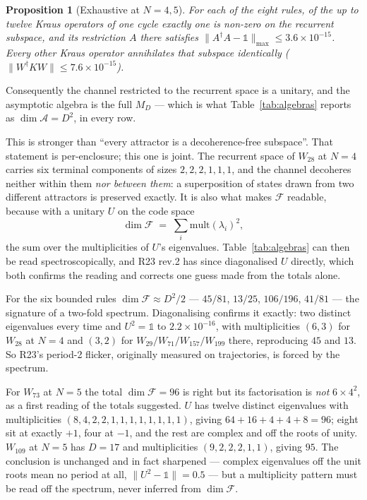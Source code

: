 \documentclass[11pt]{article}
\newcommand{\F}{\mathcal{F}}
\newcommand{\A}{\mathcal{A}}
\theoremstyle{plain}
\newtheorem{proposition}{Proposition}
\theoremstyle{remark}
\begin{document}
\begin{proposition}[Exhaustive at $N = 4, 5$]
\label{prop:unitary}
For each of the eight rules, of the up to twelve Kraus operators of one cycle
exactly \emph{one} is non-zero on the recurrent subspace, and its restriction
$A$ there satisfies $\lVert A^\dagger A - \mathbb{1}\rVert_{\max} \le
3.6\times10^{-15}$. Every other Kraus operator annihilates that subspace
identically ($\lVert W^\dagger K W\rVert \le 7.6\times10^{-15}$).
\end{proposition}

\noindent Consequently the channel restricted to the recurrent space is a
unitary, and the asymptotic algebra is the full $M_D$ --- which is what
Table~\ref{tab:algebras} reports as $\dim\A = D^2$, in every row.

This is stronger than ``every attractor is a decoherence-free subspace''. That
statement is per-enclosure; this one is joint. The recurrent space of $W_{28}$
at $N=4$ carries six terminal components of sizes $2,2,2,1,1,1$, and the
channel decoheres neither within them \emph{nor between them}: a superposition
of states drawn from two different attractors is preserved exactly. It is also
what makes $\F$ readable, because with a unitary $U$ on the code space
\[
  \dim\F \;=\; \sum_i \mathrm{mult}(\lambda_i)^2 ,
\]
the sum over the multiplicities of $U$'s eigenvalues. Table~\ref{tab:algebras}
can then be read spectroscopically, and R23 rev.2 has since diagonalised $U$
directly, which both confirms the reading and corrects one guess made from the
totals alone.

For the six bounded rules $\dim\F \approx D^2/2$ --- $45/81$, $13/25$,
$106/196$, $41/81$ --- the signature of a two-fold spectrum. Diagonalising
confirms it exactly: two distinct eigenvalues every time and $U^2 = \mathbb{1}$
to $2.2\times10^{-16}$, with multiplicities $(6,3)$ for $W_{28}$ at $N=4$ and
$(3,2)$ for $W_{29}/W_{71}/W_{157}/W_{199}$ there, reproducing $45$ and $13$.
So R23's period-2 flicker, originally measured on trajectories, is forced by the
spectrum.

For $W_{73}$ at $N=5$ the total $\dim\F = 96$ is right but its factorisation is
\emph{not} $6\times4^2$, as a first reading of the totals suggested. $U$ has
twelve distinct eigenvalues with multiplicities $(8,4,2,2,1,1,1,1,1,1,1,1)$,
giving $64+16+4+4+8 = 96$; eight sit at exactly $+1$, four at $-1$, and the rest
are complex and off the roots of unity. $W_{109}$ at $N=5$ has $D=17$ and
multiplicities $(9,2,2,2,1,1)$, giving $95$. The conclusion is unchanged and in
fact sharpened --- complex eigenvalues off the unit roots mean no period at all,
$\lVert U^2 - \mathbb{1}\rVert = 0.5$ --- but a multiplicity pattern must be
read off the spectrum, never inferred from $\dim\F$.
\end{document}
